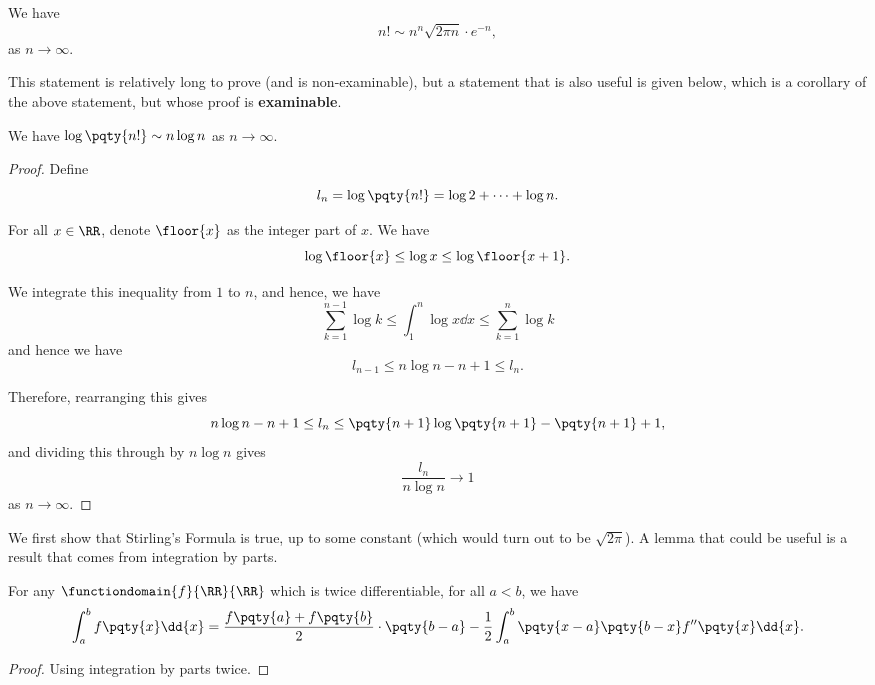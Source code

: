 \begin{theorem}
    \label{thm:stirling-formula}%
    We have
    \[
        n! \sim n^n \sqrt{2 \pi n} \cdot e^{-n},
    \]
    as \(n \to \infty\).
\end{theorem}

This statement is relatively long to prove (and is non-examinable), but a statement that is also useful is given below, which is a corollary of the above statement, but whose proof is \textbf{examinable}.

\begin{corollary}
    \label{cor:weaker-statement-of-stirling}%
    We have \(\log \pqty{n!} \sim n \log n\) as \(n \to \infty\).
\end{corollary}

\begin{proof}
    Define
    \[
        l_n = \log\pqty{n!} = \log 2 + \cdots + \log n.
    \]

    For all \(x \in \RR\), denote \(\floor{x}\) as the integer part of \(x\). We have
    \[
        \log \floor{x} \leq \log x \leq \log \floor{x + 1}.
    \]

    We integrate this inequality from \(1\) to \(n\), and hence, we have
    \[
        \sum_{k = 1}^{n - 1} \log k \leq \int_{1}^{n} \log x \dd{x} \leq \sum_{k = 1}^{n} \log k
    \]
    and hence we have
    \[
        l_{n - 1} \leq n \log n - n + 1 \leq l_n.
    \]

    Therefore, rearranging this gives
    \[
        n \log n - n + 1 \leq l_n \leq \pqty{n + 1} \log \pqty{n + 1} - \pqty{n + 1} + 1,
    \]
    and dividing this through by \(n \log n\) gives
    \[
        \frac{l_n}{n \log n} \to 1
    \]
    as \(n \to \infty\).
\end{proof}

We first show that Stirling's Formula is true, up to some constant (which would turn out to be \(\sqrt{2\pi}\)). A lemma that could be useful is a result that comes from integration by parts.

\begin{lemma}
    \label{lem:some-integration-formula}%
    For any \(\functiondomain{f}{\RR}{\RR}\) which is twice differentiable, for all \(a < b\), we have
    \[
        \int_a^b f\pqty{x} \dd{x} = \frac{f\pqty{a} + f\pqty{b}}{2} \cdot \pqty{b - a} - \frac{1}{2} \int_a^b \pqty{x - a} \pqty{b - x} f''\pqty{x} \dd{x}.
    \]
\end{lemma}

\begin{proof}
    Using integration by parts twice.
\end{proof}



